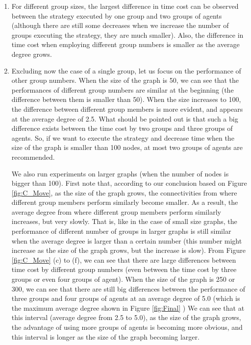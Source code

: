 \begin{enumerate}
\item For different group sizes, the largest difference in time cost can be observed between the strategy executed by one group and two groups of agents  (although there are still some decreases when we increase the number of groups executing the strategy, they are much smaller). Also, the difference in time cost when employing different group numbers is smaller as the average degree grows.

\item Excluding now the case of a single group, let us focus on the performance of other group numbers. When the size of the graph is 50, we can see that the performances of different group numbers are similar at the beginning (the difference between them is smaller than 50). When the size increases to 100, the difference   between different group members is more evident, and appears at the average degree of 2.5. What should be pointed out is that such a big difference exists between the time cost by two groups and three groups of agents. So, if we want to execute the strategy and decrease time when the size of the graph is smaller than 100 nodes, at most two groups of agents are recommended.

We also run experiments on larger  graphs  (when the number of nodes is bigger than 100). 
First note that, according to our conclusion based on Figure \ref{fig:C_Move}, as the size of the graph grows, the connectivities from where different group members perform similarly  become smaller. 
As a result, the average degree from where different group members perform similarly   increases, but very slowly. That is, like in the case of   small size graphs, the performance of different number of groups in larger graphs is still similar   when the average degree is larger than a certain number (this number might increase as the size of the graph grows,  but the increase is slow). From Figure \ref{fig:C_Move} (c) to (f), we can see that there are large differences between time cost by different group numbers (even between the time cost by three groups or even four groups of agent). When the size of the graph is 250 or 300, we can see that there are still  big differences between the performance of three groups and four groups of agents at an average degree of 5.0 (which is the maximum average degree shown in Figure \ref{fig:Final} )
We can see that at this interval (average degree from 2.5 to 5.0), as the size of the graph grows, the advantage of using more groups of agents is becoming more obvious, and this interval is longer as the size of the graph becoming larger.


 \end{enumerate}



